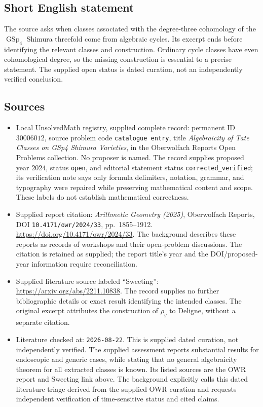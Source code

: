 \documentclass[11pt]{article}
\begin{document}
\subsection{Short English statement}
The source asks when classes associated with the degree-three cohomology of the \(\operatorname{GSp}_4\) Shimura threefold come from algebraic cycles. Its excerpt ends before identifying the relevant classes and construction. Ordinary cycle classes have even cohomological degree, so the missing construction is essential to a precise statement. The supplied open status is dated curation, not an independently verified conclusion.
\subsection{Sources}
\begin{itemize}
\item Local UnsolvedMath registry, supplied complete record: permanent ID \(30006012\), source problem code \texttt{catalogue entry}, title \emph{Algebraicity of Tate Classes on GSp4 Shimura Varieties}, in the Oberwolfach Reports Open Problems collection. No proposer is named. The record supplies proposed year \(2024\), status \texttt{open}, and editorial statement status \texttt{corrected\_verified}; its verification note says only formula delimiters, notation, grammar, and typography were repaired while preserving mathematical content and scope. These labels do not establish mathematical correctness.
\item Supplied report citation: \emph{Arithmetic Geometry (2025)}, Oberwolfach Reports, DOI \texttt{10.4171/owr/2024/33}, pp.~1855--1912. \url{https://doi.org/10.4171/owr/2024/33}. The background describes these reports as records of workshops and their open-problem discussions. The citation is retained as supplied; the report title's year and the DOI/proposed-year information require reconciliation.
\item Supplied literature source labeled ``Sweeting'': \url{https://arxiv.org/abs/2211.10838}. The record supplies no further bibliographic details or exact result identifying the intended classes. The original excerpt attributes the construction of \(\rho_g\) to Deligne, without a separate citation.
\item Literature checked at: \texttt{2026-08-22}. This is supplied dated curation, not independently verified. The supplied assessment reports substantial results for endoscopic and generic cases, while stating that no general algebraicity theorem for all extracted classes is known. Its listed sources are the OWR report and Sweeting link above. The background explicitly calls this dated literature triage derived from the supplied OWR curation and requests independent verification of time-sensitive status and cited claims.
\end{itemize}
\end{document}
